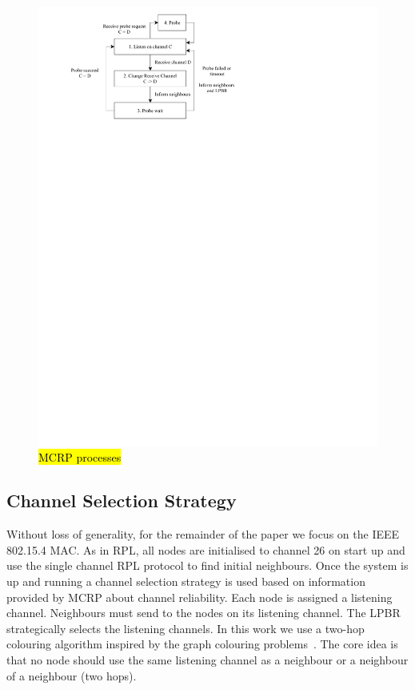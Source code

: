 \begin{figure}
\centering
\includegraphics[trim=2cm 20.5cm 9cm 0cm, clip=true, totalheight=0.2\textheight]{figures/MCRPprocesses.pdf}
\caption{\hl{MCRP processes}}
\label{fig_mcrp}
\end{figure}

\subsection{Channel Selection Strategy}
Without loss of generality, for the remainder of the paper we focus on the IEEE 802.15.4 MAC. As in RPL, all nodes are initialised to channel 26 on start up and use the single channel RPL protocol to find initial neighbours.  Once the system is up and running a channel selection strategy is used based on information provided by MCRP about channel reliability.  Each node is assigned a listening channel.  Neighbours must send to the nodes on its listening channel.  The LPBR strategically selects the listening channels.  In this work we use a two-hop colouring algorithm inspired by the graph colouring problems~\cite{graphColouring}. The core idea is that no node should use the same listening channel as a neighbour or a neighbour of a neighbour (two hops).

